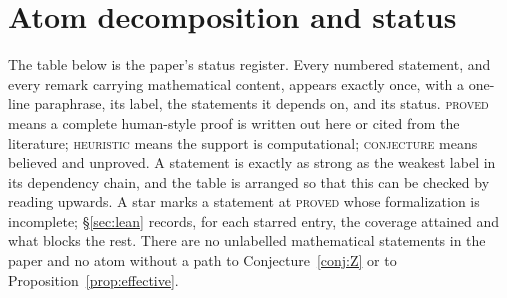 \documentclass[11pt]{article}
\theoremstyle{plain}
\theoremstyle{definition}
\theoremstyle{remark}
\begin{document}
\section{Atom decomposition and status}\label{sec:atoms}

The table below is the paper's status register. Every numbered statement, and every remark
carrying mathematical content, appears exactly once, with a one-line paraphrase, its label, the
statements it depends on, and its status. \textsc{proved} means a complete human-style proof is
written out here or cited from the literature; \textsc{heuristic} means the support is
computational; \textsc{conjecture} means believed and unproved. A statement is exactly as strong
as the weakest label in its dependency chain, and the table is arranged so that this can be
checked by reading upwards. A star marks a statement at \textsc{proved} whose formalization is
incomplete; \S\ref{sec:lean} records, for each starred entry, the coverage attained and what
blocks the rest. There are no unlabelled mathematical statements in the paper and no atom without
a path to Conjecture~\ref{conj:Z} or to Proposition~\ref{prop:effective}.
\end{document}
